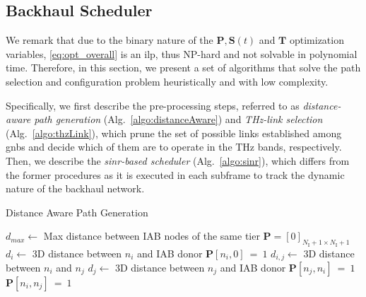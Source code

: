 \subsection{Backhaul Scheduler}
\label{sub:BackSche}

We remark that due to the binary nature of the $\bm{P}, \bm{S}(t)$ and $\bm{T}$ optimization variables, \eqref{eq:opt_overall} is an \gls{ilp}, thus NP-hard and not solvable in polynomial time. Therefore, in this section, we present a set of algorithms that solve the path selection and configuration problem heuristically and with low complexity. 

Specifically, we first describe the pre-processing steps, referred to as \textit{distance-aware path generation} (Alg.~\ref{algo:distanceAware}) and \textit{THz-link selection} (Alg.~\ref{algo:thzLink}), which prune the set of possible links established among \glspl{gnb} and decide which of them are to operate in the THz bands, respectively. Then, we describe the \textit{\gls{sinr}-based scheduler} (Alg.~\ref{algo:sinr}), which differs from the former procedures as it is executed in each subframe to track the dynamic nature of the backhaul network.

\begin{algorithm}[b]
\small
	\caption{Distance Aware Path Generation} 
	\begin{algorithmic}
    \State $d_{max} \gets$ Max distance between IAB nodes of the same tier
	\State $\bm{P} = [0]_{N_{\mathrm{I}} + 1 \times N_{\mathrm{I}} + 1}$
                \State $d_i \gets $ 3D distance between $n_i$ and IAB donor
                		\State $ \bm{P} [n_i, 0]~=~1$
                \EndIf
				\State $d_{i, j} \gets$ 3D distance between $n_i$ and $n_j$ 
    				\State $d_j \gets$ 3D distance between $n_j$ and IAB donor
        				\State $ \bm{P} [n_j, n_i]~=~1$
    				\Else 
    				    \State $ \bm{P} [n_i, n_j]~=~1$
				    \EndIf
				\EndIf
			\EndFor
		\EndFor
	\end{algorithmic} 
\label{algo:distanceAware}
\end{algorithm}

